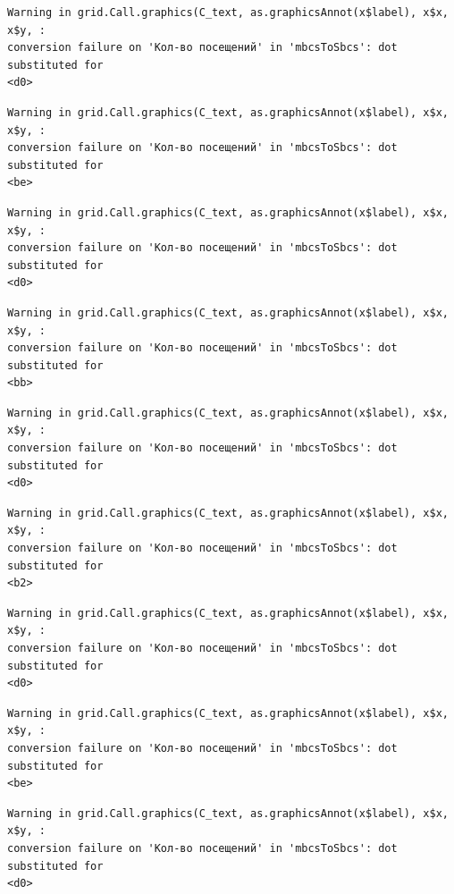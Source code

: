 \documentclass[
  letterpaper,
  DIV=11,
  numbers=noendperiod]{scrartcl}
\begin{document}
\begin{verbatim}
Warning in grid.Call.graphics(C_text, as.graphicsAnnot(x$label), x$x, x$y, :
conversion failure on 'Кол-во посещений' in 'mbcsToSbcs': dot substituted for
<d0>
\end{verbatim}

\begin{verbatim}
Warning in grid.Call.graphics(C_text, as.graphicsAnnot(x$label), x$x, x$y, :
conversion failure on 'Кол-во посещений' in 'mbcsToSbcs': dot substituted for
<be>
\end{verbatim}

\begin{verbatim}
Warning in grid.Call.graphics(C_text, as.graphicsAnnot(x$label), x$x, x$y, :
conversion failure on 'Кол-во посещений' in 'mbcsToSbcs': dot substituted for
<d0>
\end{verbatim}

\begin{verbatim}
Warning in grid.Call.graphics(C_text, as.graphicsAnnot(x$label), x$x, x$y, :
conversion failure on 'Кол-во посещений' in 'mbcsToSbcs': dot substituted for
<bb>
\end{verbatim}

\begin{verbatim}
Warning in grid.Call.graphics(C_text, as.graphicsAnnot(x$label), x$x, x$y, :
conversion failure on 'Кол-во посещений' in 'mbcsToSbcs': dot substituted for
<d0>
\end{verbatim}

\begin{verbatim}
Warning in grid.Call.graphics(C_text, as.graphicsAnnot(x$label), x$x, x$y, :
conversion failure on 'Кол-во посещений' in 'mbcsToSbcs': dot substituted for
<b2>
\end{verbatim}

\begin{verbatim}
Warning in grid.Call.graphics(C_text, as.graphicsAnnot(x$label), x$x, x$y, :
conversion failure on 'Кол-во посещений' in 'mbcsToSbcs': dot substituted for
<d0>
\end{verbatim}

\begin{verbatim}
Warning in grid.Call.graphics(C_text, as.graphicsAnnot(x$label), x$x, x$y, :
conversion failure on 'Кол-во посещений' in 'mbcsToSbcs': dot substituted for
<be>
\end{verbatim}

\begin{verbatim}
Warning in grid.Call.graphics(C_text, as.graphicsAnnot(x$label), x$x, x$y, :
conversion failure on 'Кол-во посещений' in 'mbcsToSbcs': dot substituted for
<d0>
\end{verbatim}
\end{document}

